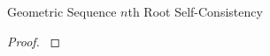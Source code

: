 \begin{theorem}{Geometric Sequence $n$th Root Self-Consistency}
\label{thm:geom-seq-nth-root-algo-self-consistency}

\end{theorem}

\begin{proof}
\label{prf:geom-seq-nth-root-algo-self-consistency}

\end{proof}
